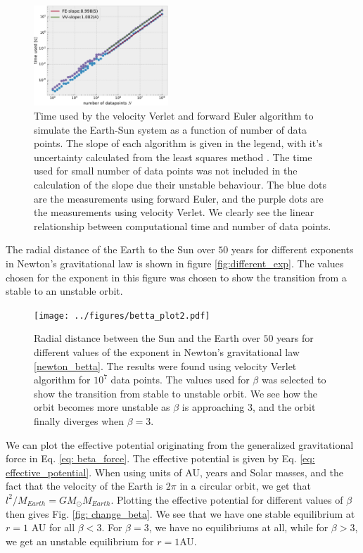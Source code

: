 \documentclass[%
 reprint,
nofootinbib,
aps,
]{revtex4-1}
\begin{document}
\begin{figure}
  \centering
  \includegraphics[width=0.45\textwidth]{../figures/timer_VV_and_FE.pdf}
  \caption{Time used by the velocity Verlet and forward Euler algorithm to simulate the Earth-Sun system as a function of number of data points. The slope of each algorithm is given in the legend, with it's uncertainty calculated from the least squares method \cite{Squires}. The time used for small number of data points was not included in the calculation of the slope due their unstable behaviour. The blue dots are the measurements using forward Euler, and the purple dots are the measurements using velocity Verlet. We clearly see the linear relationship between computational time and number of data points.}
  \label{fig:time_relation}
\end{figure}

The radial distance of the Earth to the Sun over $50$ years for different exponents in Newton's gravitational law is shown in figure \vref{fig:different_exp}. The values chosen for the exponent in this figure was chosen to show the transition from a stable to an unstable orbit.

\begin{figure}
  \centering
  \texttt{[image: ../figures/betta\_plot2.pdf]}
  \caption{Radial distance between the Sun and the Earth over $50$ years for different values of the exponent in Newton's gravitational law \eqref{newton_betta}. The results were found using velocity Verlet algorithm for $10^7$ data points. The values used for $\beta$ was selected to show the transition from stable to unstable orbit. We see how the orbit becomes more unstable as $\beta$ is approaching $3$, and the orbit finally diverges when $\beta=3$.}
  \label{fig:different_exp}
\end{figure}

We can plot the effective potential originating from the generalized gravitational force in Eq. \eqref{eq: beta_force}. The effective potential is given by Eq. \eqref{eq: effective_potential}. When using units of AU, years and Solar masses, and the fact that the velocity of the Earth is $2\pi$ in a circular orbit, we get that $l^2/M_{Earth} = GM_\odot M_{Earth}$. Plotting the effective potential for different values of $\beta$ then gives Fig. \vref{fig: change_beta}. We see that we have one stable equilibrium at $r = 1$
AU for all $\beta < 3$. For $\beta = 3$, we have no equilibriums at all, while for $\beta > 3$, we get an unstable equilibrium for $r = 1$AU.
\end{document}
